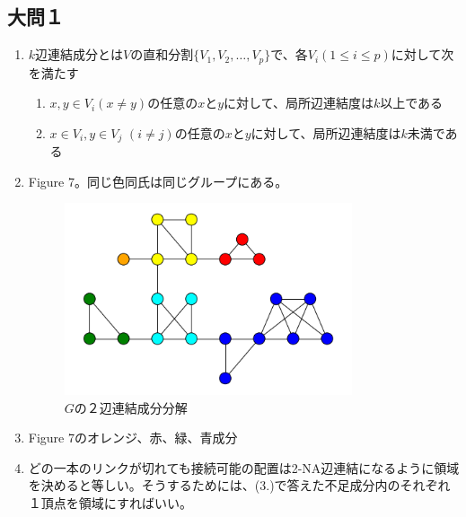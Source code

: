 \documentclass{report}
\begin{document}
\begin{CJK}{UTF8}{min}
    \subsection*{大問１}
    \begin{enumerate}
        \item $k$辺連結成分とは$V$の直和分割$\{V_1,V_2,\dots,V_p\}$で、各$V_i (1\leq i \leq p)$に対して次を満たす
              \begin{enumerate}
                  \item $x,y\in V_i (x\neq y)$の任意の$x$と$y$に対して、局所辺連結度は$k$以上である
                  \item $x\in V_i, y\in V_j$ $(i\neq j)$の任意の$x$と$y$に対して、局所辺連結度は$k$未満である
              \end{enumerate}
        \item Figure 7。同じ色同氏は同じグループにある。
              \begin{figure}[!h]
                  \centerline{\includegraphics[width=0.8\textwidth]{data/k-connect.png}}
                  \caption{$G$の２辺連結成分分解}
              \end{figure}
        \item Figure 7のオレンジ、赤、緑、青成分
        \item どの一本のリンクが切れても接続可能の配置は2-NA辺連結になるように領域を決めると等しい。そうするためには、(3.)で答えた不足成分内のそれぞれ１頂点を領域にすればいい。
    \end{enumerate}

\end{CJK}
\end{document}
